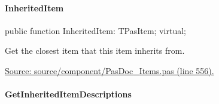 \documentclass{report}
\newif\ifpdf
\begin{document}
\paragraph*{InheritedItem}\hspace*{\fill}

\label{PasDoc_Items.TPasItem-InheritedItem}
\begin{list}{}{
\setlength{\itemindent}{0cm}
\setlength{\listparindent}{0cm}
\setlength{\leftmargin}{\evensidemargin}
\addtolength{\leftmargin}{\tmplength}
\settowidth{\labelsep}{X}
\addtolength{\leftmargin}{\labelsep}
\setlength{\labelwidth}{\tmplength}
}
\item[\textbf{Declaration}\hfill]
\ifpdf
\begin{flushleft}
\fi
\begin{ttfamily}
public function InheritedItem: TPasItem; virtual;\end{ttfamily}

\ifpdf
\end{flushleft}
\fi

\par
\item[\textbf{Description}]
Get the closest item that this item inherits from.\par
\href{https://github.com/pasdoc/pasdoc/blob/master/source/component/PasDoc_Items.pas#L556}{Source: source/component/PasDoc{\_}Items.pas (line 556).}

\end{list}
\paragraph*{GetInheritedItemDescriptions}\hspace*{\fill}
\end{document}
